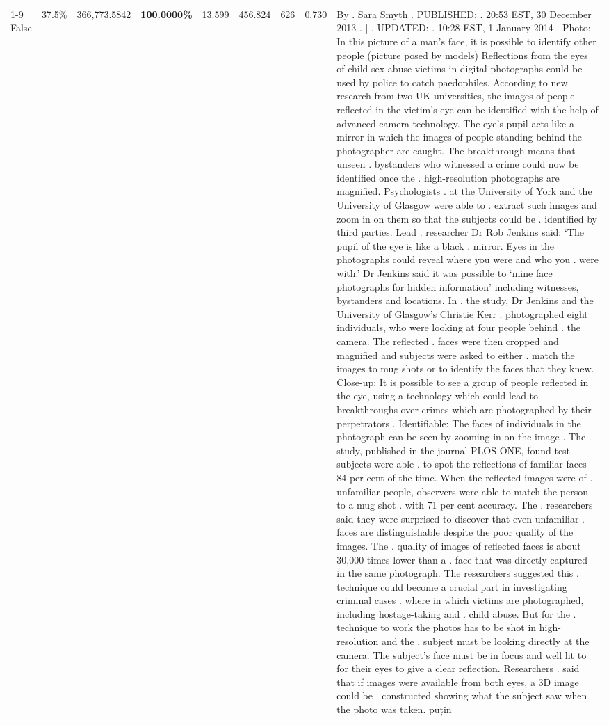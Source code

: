 \begin{table}[H]
\begin{tabular}{lllrlllll}
\cline{1-9}
False & 37.5\% & 366,773.5842 & \bfseries \color{red} 100.0000\% & 13.599 & 456.824 & 626 & 0.730 & By . Sara Smyth . PUBLISHED: . 20:53 EST, 30 December 2013 . | . UPDATED: . 10:28 EST, 1 January 2014 . Photo: In this picture of a man's face, it is possible to identify other people (picture posed by models) Reflections from the eyes of child sex abuse victims in digital photographs could be used by police to catch paedophiles. According to new research from two UK universities, the images of people reflected in the victim's eye can be identified with the help of advanced camera technology. The eye's pupil acts like a mirror in which the images of people standing behind the photographer are caught. The breakthrough means that unseen . bystanders who witnessed a crime could now be identified once the . high-resolution photographs are magnified. Psychologists . at the University of York and the University of Glasgow were able to . extract such images and zoom in on them so that the subjects could be . identified by third parties. Lead . researcher Dr Rob Jenkins said: ‘The pupil of the eye is like a black . mirror. Eyes in the photographs could reveal where you were and who you . were with.' Dr Jenkins said it was possible to ‘mine face photographs for hidden information' including witnesses, bystanders and locations. In . the study, Dr Jenkins and the University of Glasgow's Christie Kerr . photographed eight individuals, who were looking at four people behind . the camera. The reflected . faces were then cropped and magnified and subjects were asked to either . match the images to mug shots or to identify the faces that they knew. Close-up: It is possible to see a group of people reflected in the eye, using a technology which could lead to breakthroughs over crimes which are photographed by their perpetrators . Identifiable: The faces of individuals in the photograph can be seen by zooming in on the image . The . study, published in the journal PLOS ONE, found test subjects were able . to spot the reflections of familiar faces 84 per cent of the time. When the reflected images were of . unfamiliar people, observers were able to match the person to a mug shot . with 71 per cent accuracy. The . researchers said they were surprised to discover that even unfamiliar . faces are distinguishable despite the poor quality of the images. The . quality of images of reflected faces is about 30,000 times lower than a . face that was directly captured in the same photograph. The researchers suggested this . technique could become a crucial part in investigating criminal cases . where in which victims are photographed, including hostage-taking and . child abuse. But for the . technique to work the photos has to be shot in high-resolution and the . subject must be looking directly at the camera. The subject's face must be in focus and well lit to for their eyes to give a clear reflection. Researchers . said that if images were available from both eyes, a 3D image could be . constructed showing what the subject saw when the photo was taken. puțin \\

\end{tabular}
\end{table}
